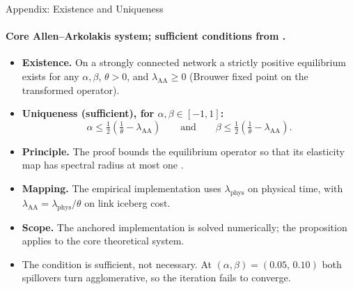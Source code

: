 \documentclass[11pt,aspectratio=169]{beamer}
\newcommand{\navback}[1]{\par\vspace{0.35em}\noindent\hfill\hyperlink{#1}{\beamerreturnbutton{back}}}
\begin{document}
\begin{frame}[label=appexist]{Appendix: Existence and Uniqueness}
\framesubtitle{Core Allen--Arkolakis system; sufficient conditions from \citet[Proposition~1]{allenarkolakis2022}.}
\small
\begin{itemize}
  \item \textbf{Existence.} On a strongly connected network a strictly positive equilibrium exists for any $\alpha,\beta$, $\theta>0$, and $\lambda_{\mathrm{AA}}\ge0$ (Brouwer fixed point on the transformed operator).
  \item \textbf{Uniqueness (sufficient), for $\alpha,\beta\in[-1,1]$:}
  \vspace{-0.15em}\[
    \alpha\le\tfrac12\!\left(\tfrac1\theta-\lambda_{\mathrm{AA}}\right)
    \qquad\text{and}\qquad
    \beta\le\tfrac12\!\left(\tfrac1\theta-\lambda_{\mathrm{AA}}\right).
  \]
  \item \textbf{Principle.} The proof bounds the equilibrium operator so that its elasticity map has spectral radius at most one \citep{allenarkolakisli2020,karlin1967}.
  \item \textbf{Mapping.} The empirical implementation uses $\lambda_{\mathrm{phys}}$ on physical time, with $\lambda_{\mathrm{AA}}=\lambda_{\mathrm{phys}}/\theta$ on link iceberg cost.
  \item \textbf{Scope.} The anchored implementation is solved numerically; the proposition applies to the core theoretical system.
  \item The condition is sufficient, not necessary. At $(\alpha,\beta)=(0.05,\,0.10)$ both spillovers turn agglomerative, so the iteration fails to converge.
\end{itemize}
\navback{equilibrium}
\end{frame}

\end{document}
